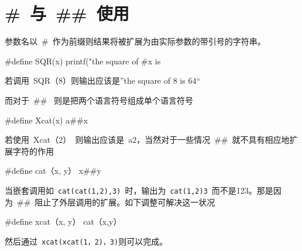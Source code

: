 \section{\#~与~\#\#~使用}
\label{sec:cat}
参数名以~\#~作为前缀则结果将被扩展为由实际参数的带引号的字符串。
\begin{code}
#define SQR(x) printf("the square of #x is %
\end{code}
若调用~SQR（8）则输出应该是”the square of 8 is 64“

而对于~\#\#~ 则是把两个语言符号组成单个语言符号
\begin{code}
#define Xcat(x) a##x
\end{code} 
若使用~Xcat（2）~则输出应该是~a2，当然对于一些情况~\#\#~就不具有相应地扩展字符的作用
\begin{code}
 #define cat（x, y）  x##y
\end{code}
当嵌套调用如~\verb|cat(cat(1,2),3)|~时，输出为~\verb|cat(1,2)3|~而不是123。那是因为~\#\#~阻止了外层调用的扩展。如下调整可解决这一状况
\begin{code}
#define xcat（x, y）   cat（x,y）
\end{code}
然后通过~\verb|xcat(xcat(1，2)，3)|则可以完成。


